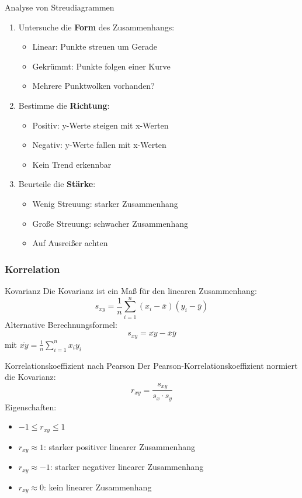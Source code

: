 \begin{KR}{Analyse von Streudiagrammen}
\begin{enumerate}
    \item Untersuche die \textbf{Form} des Zusammenhangs:
    \begin{itemize}
        \item Linear: Punkte streuen um Gerade
        \item Gekrümmt: Punkte folgen einer Kurve
        \item Mehrere Punktwolken vorhanden?
    \end{itemize}
    \item Bestimme die \textbf{Richtung}:
    \begin{itemize}
        \item Positiv: y-Werte steigen mit x-Werten
        \item Negativ: y-Werte fallen mit x-Werten
        \item Kein Trend erkennbar
    \end{itemize}
    \item Beurteile die \textbf{Stärke}:
    \begin{itemize}
        \item Wenig Streuung: starker Zusammenhang
        \item Große Streuung: schwacher Zusammenhang
        \item Auf Ausreißer achten
    \end{itemize}
\end{enumerate}
\end{KR}

\subsubsection{Korrelation}

\begin{definition}{Kovarianz}
Die Kovarianz ist ein Maß für den linearen Zusammenhang:
$$s_{xy} = \frac{1}{n}\sum_{i=1}^n (x_i - \bar{x})(y_i - \bar{y})$$
Alternative Berechnungsformel:
$$s_{xy} = \overline{xy} - \bar{x}\bar{y}$$
mit $\overline{xy} = \frac{1}{n}\sum_{i=1}^n x_i y_i$
\end{definition}

\begin{definition}{Korrelationskoeffizient nach Pearson}
Der Pearson-Korrelationskoeffizient normiert die Kovarianz:
$$r_{xy} = \frac{s_{xy}}{s_x \cdot s_y}$$
Eigenschaften:
\begin{itemize}
    \item $-1 \leq r_{xy} \leq 1$
    \item $r_{xy} \approx 1$: starker positiver linearer Zusammenhang
    \item $r_{xy} \approx -1$: starker negativer linearer Zusammenhang
    \item $r_{xy} \approx 0$: kein linearer Zusammenhang
\end{itemize}
\end{definition}


